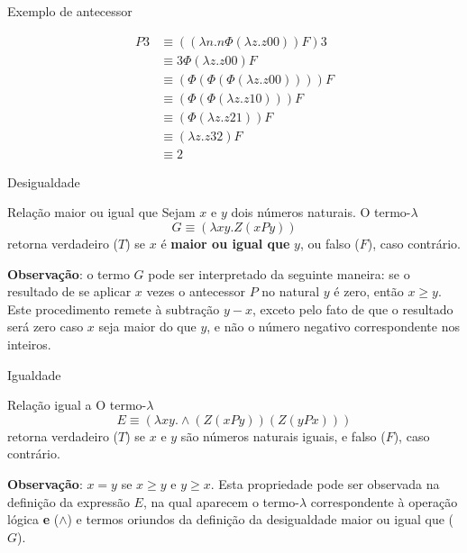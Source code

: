 \begin{frame}[fragile]{Exemplo de antecessor}

    \begin{align*}
        P3 &\equiv ((\lambda n.n\Phi (\lambda z.z00))F)3 \\
           &\equiv 3\Phi (\lambda z.z00) F \\
           &\equiv (\Phi (\Phi (\Phi (\lambda z.z00)))) F \\
           &\equiv (\Phi (\Phi (\lambda z.z10))) F \\
           &\equiv (\Phi (\lambda z.z21)) F \\
           &\equiv (\lambda z.z32) F \\
           &\equiv 2
    \end{align*}

\end{frame}

\begin{frame}[fragile]{Desigualdade}

    \begin{block}{Relação maior ou igual que}
    Sejam $x$ e $y$ dois números naturais. O termo-$\lambda$
    \[
        G \equiv (\lambda xy.Z(xPy))
    \]
    retorna verdadeiro ($T$) se $x$ é \textbf{maior ou igual que} $y$, ou falso ($F$), caso 
    contrário.
    \end{block}

    \vspace{0.1in}

    \textbf{Observação}: o termo $G$ pode ser interpretado da seguinte maneira: se o resultado de
    se aplicar $x$ vezes o antecessor $P$ no natural $y$ é zero, então $x\geq y$. Este 
    procedimento remete à subtração $y - x$, exceto pelo fato de que o resultado será zero
    caso $x$ seja maior do que $y$, e não o número negativo correspondente nos inteiros.

\end{frame}

\begin{frame}[fragile]{Igualdade}

    \begin{block}{Relação igual a}
    O termo-$\lambda$
    \[
        E\equiv (\lambda xy.\land (Z(xPy))(Z(yPx)))
    \]
    retorna verdadeiro ($T$) se $x$ e $y$ são números naturais iguais, e falso ($F$), caso
    contrário.
    \end{block}

    \vspace{0.1in}

    \textbf{Observação}: $x = y$ se $x\geq y$ e $y\geq x$. Esta propriedade pode ser observada na
    definição da expressão $E$, na qual aparecem o termo-$\lambda$ correspondente à operação
    lógica \textbf{e} ($\land$) e termos oriundos da definição da desigualdade maior ou igual que
    ($G$).
\end{frame}
